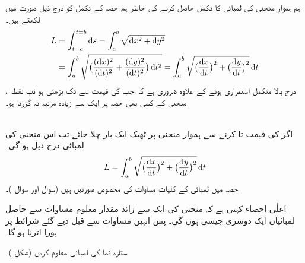 ہم ہموار منحنی  کی لمبائی کا تکمل حاصل کرنے کی خاطر ہم حصہ  کے تکمل   کو درج ذیل صورت میں لکھتے ہیں۔ 
\begin{align*}
L&=\int_{t=a}^{t=b}\dif s=\int_a^b\sqrt{\dif x^2+\dif y^2}\\
&=\int_a^b\sqrt{\big(\frac{(\dif x)^2}{(\dif t)^2}+\frac{(\dif y)^2}{(\dif t)^2}\big)\dif t^2}=\int_a^b\sqrt{\big(\frac{\dif x}{\dif t}\big)^2+\big(\frac{\dif y}{\dif t}\big)^2}\dif t
\end{align*}
درج بالا متکمل استمراری ہونے کے علاوہ ضروری ہے کہ جب  کی قیمت  سے  تک بڑھتی ہو تب نقطہ ، منحنی کے کسی بھی حصہ پر ایک سے زیادہ مرتبہ نہ گزرتا ہو۔

\\
اگر  کی قیمت  تا  کرنے سے ہموار منحنی  پر ٹھیک ایک بار چلا جائے  تب اس منحنی کی لمبائی درج ذیل ہو گی۔
\begin{align}\label{مساوات_مخروط_لمبائی_منحنی}
L=\int_a^b\sqrt{\big(\frac{\dif x}{\dif t}\big)^2+\big(\frac{\dif y}{\dif t}\big)^2}\dif t
\end{align}  
حصہ  میں لمبائی کے کلیات مساوات  کی مخصوص صورتیں ہیں (سوال  اور سوال )۔

اعلٰی احصاء کہتی ہے کہ منحنی کی ایک سے زائد مقدار معلوم مساوات سے حاصل لمبائیاں ایک دوسری جیسی ہوں گی۔ پس انہیں مساوات  سے قبل دیے گئے شرائط پر پورا اترنا ہو گا۔

ستارہ نما  کی لمبائی معلوم کریں (شکل )۔

